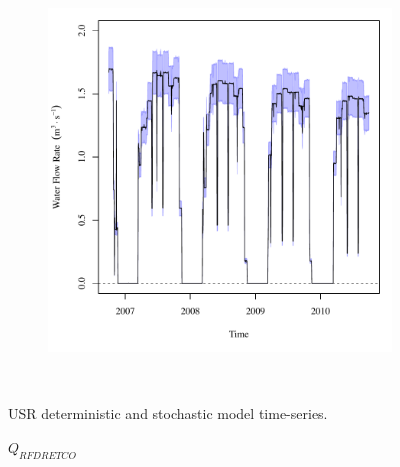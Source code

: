 \begin{linenumbers}
\begin{landscape}
\begin{figure}
\begin{subfigure}{0.7\textwidth}
		\end{subfigure}%
		\begin{subfigure}{0.7\textwidth}
			\centering
			\includegraphics[width=\textwidth]{"Figures/Results_USR/Stochastic/Q RFD"}
		\end{subfigure}\\
		\caption{USR deterministic and stochastic model time-series.}
	\end{figure}
\end{landscape}
\subfiguremid
\begin{landscape}
	\begin{figure}
		\centering
		$ Q_{RFDRETCO} $
		\begin{subfigure}{0.7\textwidth}
			\centering

\end{subfigure}
\end{figure}
\end{landscape}
\end{linenumbers}
